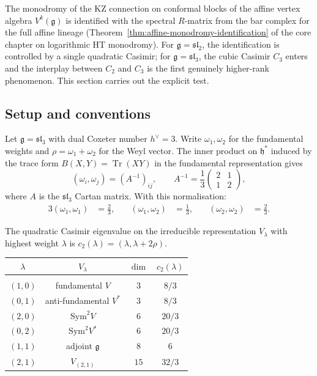 \documentclass[11pt]{article}
\newcommand{\fg}{\mathfrak{g}}
\newcommand{\fh}{\mathfrak{h}}
\newcommand{\fsl}{\mathfrak{sl}}
\newcommand{\Tr}{\operatorname{Tr}}
\begin{document}
The monodromy of the KZ connection on conformal blocks of the
affine vertex algebra $V^k(\fg)$ is identified with the spectral
$R$-matrix from the bar complex for the full affine lineage
(Theorem~\ref{thm:affine-monodromy-identification} of the core
chapter on logarithmic HT monodromy).  For $\fg = \fsl_2$, the
identification is controlled by a single quadratic Casimir; for
$\fg = \fsl_3$, the cubic Casimir $C_3$ enters and the interplay
between $C_2$ and $C_3$ is the first genuinely higher-rank
phenomenon.  This section carries out the explicit test.

\subsection{Setup and conventions}
\label{subsec:sl3-setup}

Let $\fg = \fsl_3$ with dual Coxeter number $h^\vee = 3$.
Write $\omega_1, \omega_2$ for the fundamental weights and
$\rho = \omega_1 + \omega_2$ for the Weyl vector.  The
inner product on $\fh^*$ induced by the trace form
$B(X,Y) = \Tr(XY)$ in the fundamental representation gives
\[
  (\omega_i, \omega_j) = (A^{-1})_{ij},
  \qquad
  A^{-1} = \frac{1}{3}\begin{pmatrix} 2 & 1 \\ 1 & 2 \end{pmatrix},
\]
where $A$ is the $\fsl_3$ Cartan matrix.  With this normalisation:
\begin{alignat*}{3}
  (\omega_1, \omega_1) &= \tfrac{2}{3}, &\quad
  (\omega_1, \omega_2) &= \tfrac{1}{3}, &\quad
  (\omega_2, \omega_2) &= \tfrac{2}{3}.
\end{alignat*}

The quadratic Casimir eigenvalue on the irreducible representation
$V_\lambda$ with highest weight $\lambda$ is
$c_2(\lambda) = (\lambda, \lambda + 2\rho)$.

\begin{observation}
\label{obs:sl3-casimir-table}
\begin{center}
\begin{tabular}{cccc}
  $\lambda$ & $V_\lambda$ & $\dim$ & $c_2(\lambda)$\\[2pt]
  \hline\\[-8pt]
  $(1,0)$ & fundamental $V$ & $3$ & $8/3$\\
  $(0,1)$ & anti-fundamental $V^*$ & $3$ & $8/3$\\
  $(2,0)$ & $\mathrm{Sym}^2 V$ & $6$ & $20/3$\\
  $(0,2)$ & $\mathrm{Sym}^2 V^*$ & $6$ & $20/3$\\
  $(1,1)$ & adjoint $\fg$ & $8$ & $6$\\
  $(2,1)$ & $V_{(2,1)}$ & $15$ & $32/3$\\
\end{tabular}
\end{center}
\end{observation}
\end{document}
